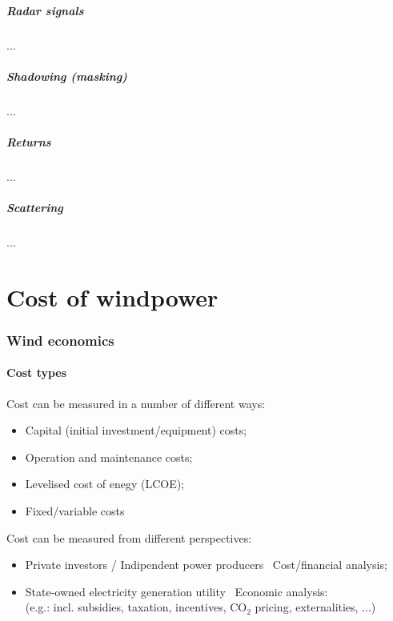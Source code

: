 \documentclass{article}
\newcommand{\tra}{\textrightarrow\ }
\begin{document}
\subsubsection{Radar signals}
...

\subsubsection{Shadowing (masking)}
...

\subsubsection{Returns}
...

\subsubsection{Scattering}
...

\newpage
\part{Cost of windpower}
\section{Wind economics}
\subsection{Cost types}
Cost can be measured in a number of different ways:
\begin{itemize}
    \item Capital (initial investment/equipment) costs;
    \item Operation and maintenance costs;
    \item Levelised cost of enegy (LCOE);
    \item Fixed/variable costs
\end{itemize}

Cost can be measured from different perspectives:
\begin{itemize}
    \item Private investors / Indipendent power producers \tra Cost/financial analysis;
    \item State-owned electricity generation utility \tra Economic analysis:\\
        (e.g.: incl. subsidies, taxation, incentives, CO$_2$ pricing, externalities, ...)
\end{itemize}
\end{document}
